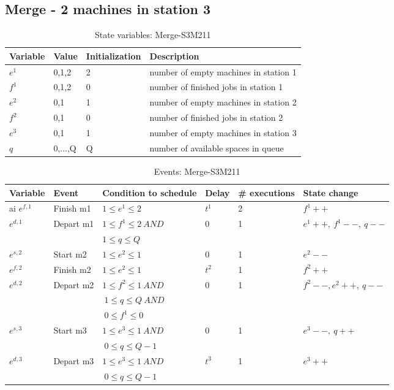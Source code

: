 \documentclass[]{interact}
\theoremstyle{plain}%
\theoremstyle{definition}
\theoremstyle{remark}
\begin{document}
\newpage
\subsection{Merge - 2 machines in station 3}
\begin{table}[h]
	\begin{tabular}{|llll|}\hline
		Variable&Value & Initialization& Description\\\hline
		$e^1$& 0,1,2&  2 &number of empty machines in station 1 \\\hline
		$f^1$&0,1,2	& 0 & number of finished jobs in station 1\\\hline
		$e^2$&0,1&1&number of empty machines in station 2 \\\hline
		$f^2$&0,1&0&number of finished jobs in station 2 \\\hline
		$e^3$&0,1&1&number of empty machines in station 3  \\	\hline
		$q$& 0,...,Q&Q&  number of available spaces in queue\\\hline
	\end{tabular}
	\caption{State variables: Merge-S3M211}
\end{table}


\begin{table}[h]
	\begin{tabular}{|llllll|}\hline
		Variable&Event & Condition to schedule & Delay&\# executions& State change\\\hline
	ai 	$e^{f,1}$&Finish m1 &  $1 \le  e^1 \le 2$	& $t^1$ &2& $f^1++$\\\hline
		$e^{d,1}$&Depart m1& $1\le   f^1  \le 2\ AND$&$0$ &1 & $e^1++,\ f^1--,\ q--$\\
											&&$ 1\le q\le Q$ &&&\\\hline
		$e^{s,2}$&Start m2 	& $1\le e^2\le 1$ & $0$ &1& $e^2--$ \\	\hline
		$e^{f,2}$&Finish m2 & $1\le e^2\le 1$ 	& $t^2$ &1 & $f^2++$\\\hline
		$e^{d,2}$&Depart m2&$1\le f^2 \le 1\ AND$&$0$  &1& $f^2--,e^2++,\ q--$\\
		&&$\ 1\le q\le Q\ AND$&&&\\
		&&$\ 0\le f^1\le 0 $ & &&\\\hline
		$e^{s,3}$& Start m3 & $1\le e^3\le 1\ AND$&$0$  &1& $e^3--,\ q++$\\
		&&$\ 0\le q\le Q-1$ & &&\\\hline
		$e^{d,3}$& Depart m3 & $1 \le e^3\le 1\ AND $ & $t^3$  &1& $e^3++$\\\hline
		&&$\ 0\le q\le Q-1$ & &&\\\hline
	\end{tabular}
	\caption{Events: Merge-S3M211}
\end{table}
\end{document}

